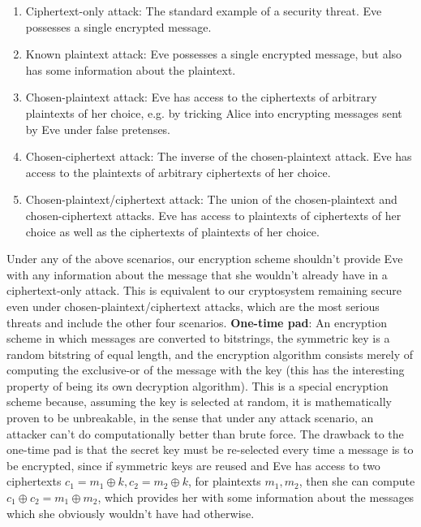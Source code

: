 \documentclass{article}
\begin{document}
\begin{enumerate}
	\item Ciphertext-only attack: The standard example of a security threat. Eve possesses a single encrypted message.
	\item Known plaintext attack: Eve possesses a single encrypted message, but also has some information about the plaintext.
	\item Chosen-plaintext attack: Eve has access to the ciphertexts of arbitrary plaintexts of her choice, e.g. by tricking Alice into encrypting messages sent by Eve under false pretenses.
	\item Chosen-ciphertext attack: The inverse of the chosen-plaintext attack. Eve has access to the plaintexts of arbitrary ciphertexts of her choice.
	\item Chosen-plaintext/ciphertext attack: The union of the chosen-plaintext and chosen-ciphertext attacks. Eve has access to plaintexts of ciphertexts of her choice as well as the ciphertexts of plaintexts of her choice.
\end{enumerate}
Under any of the above scenarios, our encryption scheme shouldn't provide Eve with any information about the message that she wouldn't already have in a ciphertext-only attack. This is equivalent to our cryptosystem remaining secure even under chosen-plaintext/ciphertext attacks, which are the most serious threats and include the other four scenarios.
\newline \newline
\textbf{One-time pad}: An encryption scheme in which messages are converted to bitstrings, the symmetric key is a random bitstring of equal length, and the encryption algorithm consists merely of computing the exclusive-or of the message with the key (this has the interesting property of being its own decryption algorithm). This is a special encryption scheme because, assuming the key is selected at random, it is mathematically proven to be unbreakable, in the sense that under any attack scenario, an attacker can't do computationally better than brute force.
\newline
The drawback to the one-time pad is that the secret key must be re-selected every time a message is to be encrypted, since if symmetric keys are reused and Eve has access to two ciphertexts $ c_1 = m_1 \oplus k, c_2 = m_2 \oplus k $, for plaintexts $ m_1, m_2 $, then she can compute $ c_1 \oplus c_2 = m_1 \oplus m_2 $, which provides her with some information about the messages which she obviously wouldn't have had otherwise.
\end{document}
